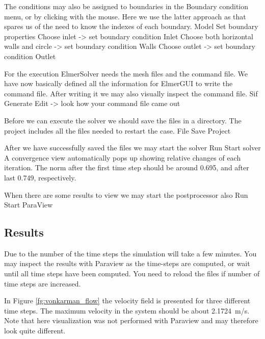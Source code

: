 The conditions may also be assigned to boundaries in the Boundary condition menu, or 
by clicking with the mouse. Here we use the latter approach as that spares us of the 
need to know the indexes of each boundary.
\ttbegin
Model
  Set boundary properties
    Choose inlet -> set boundary condition Inlet
    Choose both horizontal walls and circle -> set boundary condition Walls
    Choose outlet -> set boundary condition Outlet
\ttend


For the execution 
ElmerSolver needs the mesh files and the command file. We have now basically defined
all the information for ElmerGUI to write the command file. After writing it we may also visually 
inspect the command file.
\ttbegin
Sif 
  Generate
  Edit -> look how your command file came out  
\ttend

Before we can execute the solver we should save the files in a directory. The project includes
all the files needed to restart the case.
\ttbegin
File 
  Save Project
\ttend

After we have successfully saved the files we may start the solver
\ttbegin
Run
  Start solver
\ttend
A convergence view automatically pops up showing relative changes of each iteration.
The norm after the first time step should be around 0.695, and after last 0.749, respectively.

When there are some results to view we may start the postprocessor also
\ttbegin
Run
  Start ParaView
\ttend


\subsection*{Results}

Due to the number of the time steps the simulation will take a few minutes.
You may inspect the results with Paraview as the time-steps are computed, or
wait until all time steps have been computed.
You need to reload the files if number of time steps are increased.

In Figure \ref{fg:vonkarman_flow} the velocity field is presented for three different time steps.
The maximum velocity in the system should be about 2.1724~m/s. Note that here
visualization was not performed with Paraview and may therefore look quite different.

